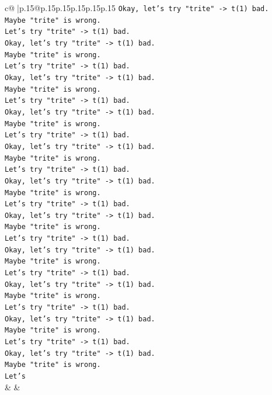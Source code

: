\documentclass{article}
\begin{document}
{\begin{supertabular}{c@{$\;$}|p{.15\linewidth}@{}p{.15\linewidth}p{.15\linewidth}p{.15\linewidth}p{.15\linewidth}p{.15\linewidth}}
{{{\texttt{Okay, let's try "trite" {-}> t(1) bad.} \\
\texttt{Maybe "trite" is wrong.} \\
\texttt{Let's try "trite" {-}> t(1) bad.} \\
\texttt{Okay, let's try "trite" {-}> t(1) bad.} \\
\texttt{Maybe "trite" is wrong.} \\
\texttt{Let's try "trite" {-}> t(1) bad.} \\
\texttt{Okay, let's try "trite" {-}> t(1) bad.} \\
\texttt{Maybe "trite" is wrong.} \\
\texttt{Let's try "trite" {-}> t(1) bad.} \\
\texttt{Okay, let's try "trite" {-}> t(1) bad.} \\
\texttt{Maybe "trite" is wrong.} \\
\texttt{Let's try "trite" {-}> t(1) bad.} \\
\texttt{Okay, let's try "trite" {-}> t(1) bad.} \\
\texttt{Maybe "trite" is wrong.} \\
\texttt{Let's try "trite" {-}> t(1) bad.} \\
\texttt{Okay, let's try "trite" {-}> t(1) bad.} \\
\texttt{Maybe "trite" is wrong.} \\
\texttt{Let's try "trite" {-}> t(1) bad.} \\
\texttt{Okay, let's try "trite" {-}> t(1) bad.} \\
\texttt{Maybe "trite" is wrong.} \\
\texttt{Let's try "trite" {-}> t(1) bad.} \\
\texttt{Okay, let's try "trite" {-}> t(1) bad.} \\
\texttt{Maybe "trite" is wrong.} \\
\texttt{Let's try "trite" {-}> t(1) bad.} \\
\texttt{Okay, let's try "trite" {-}> t(1) bad.} \\
\texttt{Maybe "trite" is wrong.} \\
\texttt{Let's try "trite" {-}> t(1) bad.} \\
\texttt{Okay, let's try "trite" {-}> t(1) bad.} \\
\texttt{Maybe "trite" is wrong.} \\
\texttt{Let's try "trite" {-}> t(1) bad.} \\
\texttt{Okay, let's try "trite" {-}> t(1) bad.} \\
\texttt{Maybe "trite" is wrong.} \\
\texttt{Let's} \\
            }
        }
    }
    & & \\ \\


\end{supertabular}}
\end{document}
